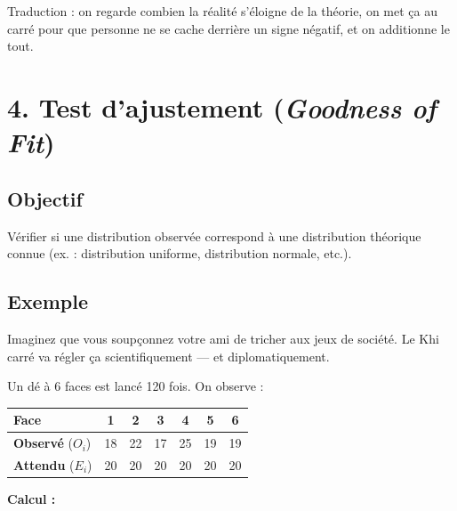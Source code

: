 \documentclass[12pt, a4paper]{article}
\begin{document}
\begin{humourbox}
Traduction : on regarde combien la réalité s'éloigne de la théorie, on met ça au carré
pour que personne ne se cache derrière un signe négatif, et on additionne le tout.
\end{humourbox}

\section{4. Test d'ajustement (\textit{Goodness of Fit})}

\subsection{Objectif}

Vérifier si une distribution observée correspond à une distribution théorique connue
(ex. : distribution uniforme, distribution normale, etc.).

\subsection{Exemple}

\begin{humourbox}
Imaginez que vous soupçonnez votre ami de tricher aux jeux de société. Le Khi carré va
régler ça scientifiquement --- et diplomatiquement.
\end{humourbox}

\vspace{0.5em}

Un dé à 6 faces est lancé 120 fois. On observe :

\vspace{0.5em}
\begin{center}
\begin{tabular}{lcccccc}
  \toprule
  \textbf{Face} & 1 & 2 & 3 & 4 & 5 & 6 \\
  \midrule
  \textbf{Observé} ($O_i$) & 18 & 22 & 17 & 25 & 19 & 19 \\
  \textbf{Attendu}  ($E_i$) & 20 & 20 & 20 & 20 & 20 & 20 \\
  \bottomrule
\end{tabular}
\end{center}

\vspace{0.5em}

\textbf{Calcul :}
\end{document}
